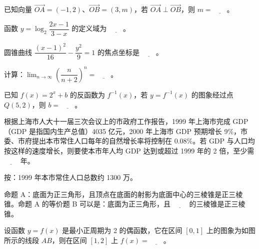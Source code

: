 \begin{question}
已知向量 $\overrightarrow{OA}=(-1,2)$、$\overrightarrow{OB}=(3,m)$，若 $\overrightarrow{OA}\perp\overrightarrow{OB}$，则 $m=\underline{\qquad}$。

\end{question}
\begin{question}
函数 $y=\log_{2}\dfrac{2x-1}{3-x}$ 的定义域为 $\underline{\qquad}$。

\end{question}
\begin{question}
圆锥曲线 $\dfrac{(x-1)^2}{16}-\dfrac{y^2}{9}=1$ 的焦点坐标是 $\underline{\qquad}$。

\end{question}
\begin{question}
计算：$\displaystyle\lim_{n\to\infty}\left(\dfrac{n}{n+2}\right)^n=\underline{\qquad}$。

\end{question}
\begin{question}
已知 $f(x)=2^x+b$ 的反函数为 $f^{-1}(x)$，若 $y=f^{-1}(x)$ 的图象经过点 $Q(5,2)$，则 $b=\underline{\qquad}$。

\end{question}
\begin{question}
根据上海市人大十一届三次会议上的市政府工作报告，1999 年上海市完成 GDP（GDP 是指国内生产总值）4035 亿元，2000 年上海市 GDP 预期增长 9\%，市委、市府提出本市常住人口每年的自然增长率将控制在 0.08\%。若 GDP 与人口均按这样的速度增长，则要使本市年人均 GDP 达到或超过 1999 年的 2 倍，至少需 $\underline{\qquad}$ 年。

按：1999 年本市常住人口总数约 1300 万。

\end{question}
\begin{question}
命题 A：底面为正三角形，且顶点在底面的射影为底面中心的三棱锥是正三棱锥。命题 A 的等价题 B 可以是：底面为正三角形，且 $\underline{\qquad}$ 的三棱锥是正三棱锥。

\Needspace{0.4\textheight}
\end{question}
\begin{question}
设函数 $y=f(x)$ 是最小正周期为 2 的偶函数，它在区间 $[0,1]$ 上的图象为如图所示的线段 $AB$，则在区间 $[1,2]$ 上 $f(x)=\underline{\qquad}$。
\nopagebreak[4]
\begin{center}\end{center}
\nopagebreak[4]
\end{question}
